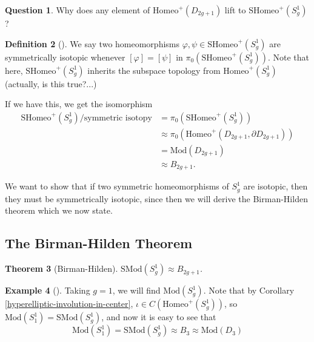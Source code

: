 \documentclass[reqno]{amsart}
\newtheorem{theorem}{Theorem}[section]
\theoremstyle{definition}
\newtheorem{definition}[theorem]{Definition}
\newtheorem{example}[theorem]{Example}
\newtheorem{question}[theorem]{Question}
\theoremstyle{remark}
\newcommand{\Mod}{{\mathrm{Mod}}}
\newcommand{\SMod}{{\mathrm{SMod}}}
\newcommand{\Homeo}{{\mathrm{Homeo}}}
\newcommand{\SHomeo}{{\mathrm{SHomeo}}}
\begin{document}
   \begin{question}
       Why does any
   element of $\Homeo^{+} \left( D_{2g+1} \right) $ 
   lift to $\SHomeo^{+} \left( S_g^{1} \right) $?
   \end{question} 

   \begin{definition}[]
       We say two homeomorphisms
       $\varphi , \psi \in \SHomeo^{+}\left( S_g^{1} \right) $ 
       are symmetrically isotopic whenever
       $\left[ \varphi  \right] =
       \left[ \psi \right] $ in
       $\pi_0 \left( \SHomeo^{+}\left( S_g^{1} \right)  \right) $.
       Note that here,
       $\SHomeo^{+} \left( S_g^{1} \right) $ inherits
       the subspace topology from
       $\Homeo^{+} \left( S_{g}^{1} \right) $ 
       (actually, is this true?...)
   \end{definition}

   If we have this, we get the isomorphism
   \begin{align*}
       \SHomeo^{+} \left( S_g^{1} \right) /
       \text{symmetric isotopy}
       &= \pi_0 \left( \SHomeo^{+}(S_g^{1}) \right) \\
       &\approx \pi_0 \left( \Homeo^{+} \left( 
       D_{2g+1}, \partial D_{2g+1} \right)  \right) \\
       &= \Mod \left( D_{2g+1} \right) \\
       &\approx B_{2g+1}.
   \end{align*}
   
   We want to show that
   if two symmetric homeomorphisms of $S_{g}^{1}$ are
   isotopic, then they must be symmetrically isotopic, since then
   we will derive the Birman-Hilden theorem which we now state.
 

   \subsection{The Birman-Hilden Theorem}

   \begin{theorem}[Birman-Hilden]
       $\SMod \left( S_g^{1} \right) \approx
       B_{2g+1}$.
   \end{theorem}


   \begin{example}[]
       Taking $g=1$, we will find
       $\Mod \left( S_g^{1} \right) $.
       Note that by Corollary
       \ref{hyperelliptic-involution-in-center},
       $\iota \in C\left( 
       \Homeo^{+}\left( S_g^{1} \right)  \right)  $, so
       $\Mod \left( S_1^{1} \right) =
       \SMod\left( S_g^{1} \right) $, and now it is
       easy to see that
       \[
       \Mod \left( S_1^{1} \right) = \SMod \left( S_g^{1} \right) 
       \approx B_{3} \approx \Mod \left( D_3 \right) 
       \] 
   \end{example}
\end{document}
